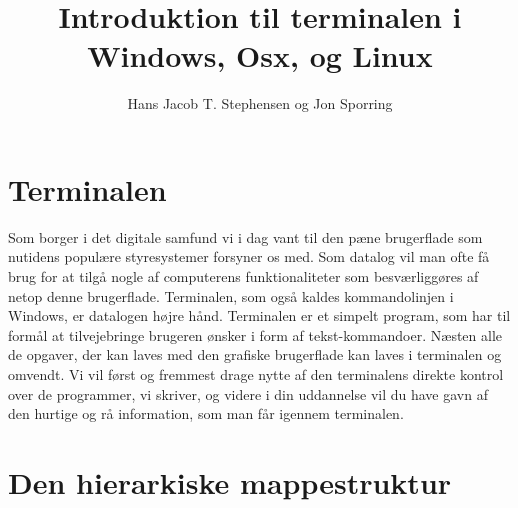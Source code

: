 \documentclass[a4paper]{article}
\title{Introduktion til terminalen i Windows, Osx, og Linux}
\author{Hans Jacob T. Stephensen og Jon Sporring }
\begin{document}
\maketitle

\section{Terminalen}

Som borger i det digitale samfund vi i dag vant til den pæne brugerflade som nutidens populære styresystemer forsyner os med. Som datalog vil man ofte få brug for at tilgå nogle af computerens funktionaliteter som besværliggøres af netop denne brugerflade. Terminalen, som også kaldes kommandolinjen i Windows, er datalogen højre hånd. Terminalen er et simpelt program, som har til formål at tilvejebringe brugeren ønsker i form af tekst-kommandoer. Næsten alle de opgaver, der kan laves med den grafiske brugerflade kan laves i terminalen og omvendt. Vi vil først og fremmest drage nytte af den terminalens direkte kontrol over de programmer, vi skriver, og videre i din uddannelse vil du have gavn af den hurtige og rå information, som man får igennem terminalen.

\section{Den hierarkiske mappestruktur}
\end{document}
